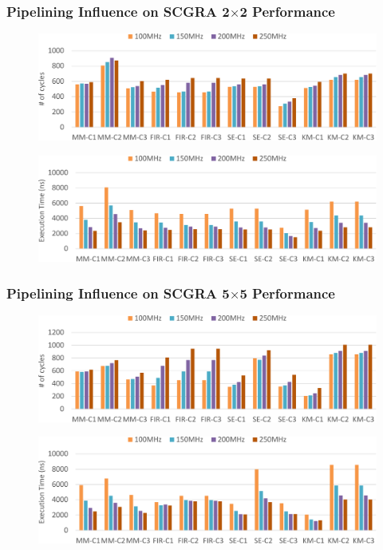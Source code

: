 \documentclass[accentcolor=tud1a,colorbacktitle,inverttitle,landscape,german,presentation,t]{tudbeamer}
\begin{document}
  \begin{frame}
  \frametitle{Pipelining Influence on SCGRA 2$\times$2 Performance}
  \begin{figure}
    \includegraphics[width=0.8\linewidth]{pipeline-cgra2x2-sim-perf}
  \end{figure}
  \begin{figure}
    \includegraphics[width=0.8\linewidth]{pipeline-cgra2x2-real-perf}
  \end{figure}
  \end{frame}

  \begin{frame}
  \frametitle{Pipelining Influence on SCGRA 5$\times$5 Performance}
  \vspace{-1em}
  \begin{figure}
    \includegraphics[width=0.8\linewidth]{pipeline-cgra5x5-sim-perf}
  \end{figure}
  \begin{figure}
    \includegraphics[width=0.8\linewidth]{pipeline-cgra5x5-real-perf}
  \end{figure}

  \end{frame}
\end{document}
